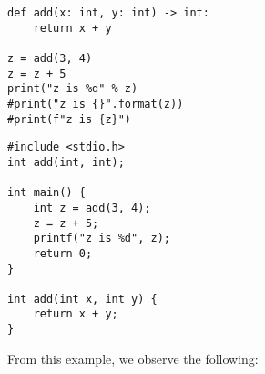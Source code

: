 \noindent
\begin{minipage}{0.40\textwidth}
    \begin{verbatim}
def add(x: int, y: int) -> int:
    return x + y

z = add(3, 4)
z = z + 5
print("z is %d" % z)
#print("z is {}".format(z))
#print(f"z is {z}")
    \end{verbatim}
\end{minipage}%
\hfill%
\begin{minipage}{0.35\textwidth}
    \begin{verbatim}
#include <stdio.h>
int add(int, int);

int main() {
    int z = add(3, 4);
    z = z + 5;
    printf("z is %d", z);
    return 0;
}

int add(int x, int y) {
    return x + y;
}
    \end{verbatim}
\end{minipage}
\newpage
From this example, we observe the following:
